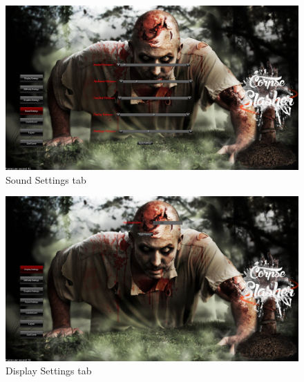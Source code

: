 \documentclass[letterpaper]{article}
\begin{document}
			
		\begin{figure}[H]
		\centering
		\includegraphics[width=130mm]{GUI_ScreenShots/SoundSettings.jpg}
		\caption{Sound Settings tab}
		\end{figure}
		
			
		\begin{figure}[H]
		\centering
		\includegraphics[width=130mm]{GUI_ScreenShots/DisplaySettings.jpg}
		\caption{Display Settings tab}
		\end{figure}
		
			
		
		
		\vspace{0.2in}
\end{document}
